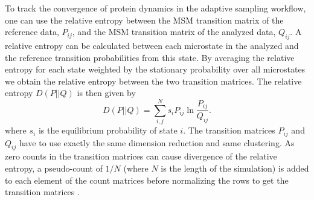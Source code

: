 To track the convergence of protein dynamics in the adaptive sampling workflow,
one can use the relative entropy \cite{bowman2010enhanced} between the
MSM transition matrix of the reference data, $P_{ij}$, and the MSM transition matrix
of the analyzed data, $Q_{ij}$.
A relative entropy can be calculated between each microstate in the analyzed
and the reference transition probabilities from this state. By averaging the
relative entropy for each state weighted by the stationary probability over all
microstates we obtain the relative entropy between the two transition matrices.
The relative entropy
$D(P||Q)$ is then given by
\begin{equation}
D(P||Q)=\sum_{i,j}^{N}s_{i}P_{ij}\ln\frac{P_{ij}}{Q_{ij}}. 
\end{equation}
where $s_{i}$ is the equilibrium probability of state $i$. The transition
matrices $P_{ij}$ and $Q_{ij}$ have to use exactly the same dimension reduction
and same clustering.
As zero counts in the transition matrices can cause divergence of the relative
entropy, a pseudo-count of $1/N$ (where $N$ is the length of the simulation) is
added to each element of the count matrices
before normalizing the rows to get the transition matrices
\cite{bowman2010enhanced}. 

